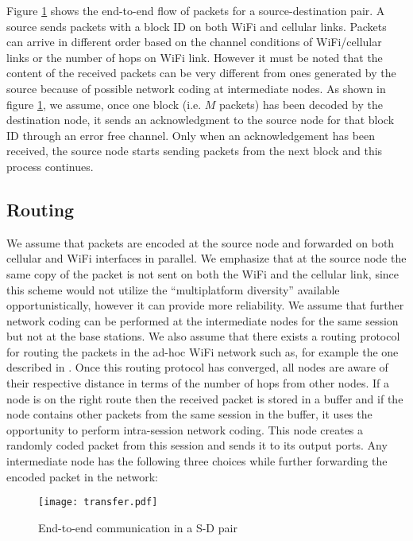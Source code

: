 \documentclass{sig-alternate-10pt}
\begin{document}
Figure \ref{fig:transfer} shows the end-to-end flow of packets for a source-destination pair. A source sends packets with a block ID on both WiFi and cellular links. Packets can arrive in different order based on the channel conditions of WiFi/cellular links or the number of hops on WiFi link. However it must be noted that the content of the received packets  can be very different from ones generated by the source because of possible network coding at intermediate nodes. As shown in figure \ref{fig:transfer}, we assume, once one block (i.e. $M$ packets) has been decoded by the destination node, it sends an acknowledgment to the source node for that block ID through an error free channel. Only when an acknowledgement has been received, the source node starts sending packets from the next block and this process continues.

\subsection{Routing}
We assume that packets are encoded at the source node and forwarded on both cellular and WiFi interfaces in parallel. We emphasize that at the source node the same copy of the packet is not sent on both the  WiFi and the cellular link, since this scheme would not utilize the ``multiplatform diversity'' available opportunistically, however it can provide more reliability. We assume that further network coding can be performed at the intermediate nodes for the same session but not at the base stations. 
We also assume that there exists a  routing protocol for routing the packets in the ad-hoc WiFi network such as, for example the one described in  \cite{cjkk06}. Once this routing protocol has converged, all nodes are aware of their respective distance in terms of the number of hops from other nodes. 
If a node is on the right route then the received packet is stored in a buffer and if the node contains  other packets from the same session in the buffer, it uses the opportunity to perform intra-session network coding. This node creates a randomly coded packet from this session and sends it to its output ports. Any intermediate node has the following three choices while further forwarding the encoded packet  in the network:
\begin{figure}[t]
\begin{center}
\texttt{[image: transfer.pdf]}
\end{center}
\caption{End-to-end communication in a S-D pair}
\label{fig:transfer}
\end{figure} 
\end{document}
